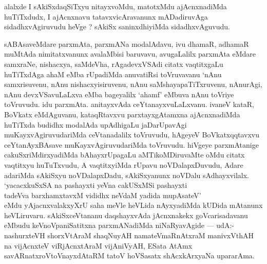 \begin{artha}
alalxde I sAkiSxdaqSiTxyu nitayxvoMdu, matotxMdu ajAcnxnadiMda huTiTxdudx, I ajAcnxnavu tatavxvicAravanunx mADadiruvAga sidadhxvAgiruvudu heVge ? sAkiSx saninxdhiyiMda sidadhxvAguvudu. 
\end{artha}

\begin{artha}
sABAsaveMdare parxmAta, parxmANa modalAdavu, ivu dhamaR, adhamaR muMtAda nimitatxvanunx avalaMbisi baruvavu, avugaLalilx parxmAta eMdare samxraNe, nishacxya, saMdeVha, rAgadevxVSAdi citatx vaqtitxgaLu huTiTxdAga ahaM eMba rUpadiMda anuvatiRsi toVruvavanu `nAnu samxrisuvenu, nAnu nishacxyisiruvenu, nAnu saMshayapaTiTxruvenu, nAnurAgi, nAnu devxVSavuLaLxva eMba bageyalilx `ahamf' eMbuva nAnu toVriye toVruvudu. idu parxmAta. anitayxvAda ceYtanayxvuLaLxvanu. ivaneV kataR, BoVkatx eMdAguvanu, kataqRtavxvu parxtayxgAtamxna ajAcnxnadiMda huTiTxda budidhx modalAda upAdhigaLu jaDarUpavAgi muKayxvAgiruvudariMda ceVtanadalilx toVruvudu, hAgeyeV BoVkatxqqtavxvu ceYtanAyxBAsave muKayxvAgiruvudariMda toVruvudu. hiVgeye parxmAtanige cakuSxriMdirxyadiMda bAhayxrUpagaLu aMTikoMDiruvaMte oMdu citatx vaqtitxyu huTuTxvudu, A vaqtitxyiMda rUpavu noVDalapxDuvudu, Adare adariMda sAkiSxyu noVDalapxDadu, sAkiSxyanunx noVDalu sAdhayxvilalx.\\ `yacacxkuSxSA na pashayxti yeVna cakUSxMSi pashayxti\\tadeVva barxhamxtavxM vididhx neVdaM yadida mupAsateV'\\ eMdu yAjacnxvalakxyXrU saha meVle heVLida nAyxyadiMda kUDida mAtanunx heVLiruvaru. sAkiSxceVtananu daqshayxvAda jAcnxnakekx goVcarisadavanu eMbudu keVnoVpaniSatitxna parxmANadiMda niNaRyavAgide --- udA:- nashurxteVH shorxVtAraM shaqNuyAH namateVmaRnAtxraM manivxVthAH na vijAcnxteV viRjAcnxtAraM vijAniVyAH, ESata AtAmx savARnatxroV\s toV\s nayxdAtaRM tatoV hoVSasatx shAcxkArxyaNa upararAma.
\end{artha}


